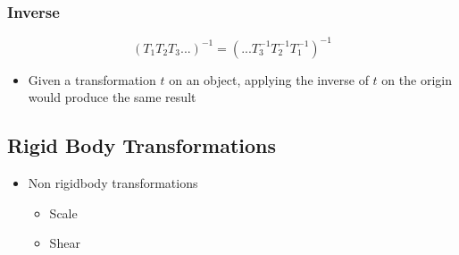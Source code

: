   \subsubsection{Inverse}

    \begin{equation}
      \left( T_{1} T_{2} T_{3} ... \right) ^{-1}
      = \left( ... T_{3}^{-1} T_{2}^{-1} T_{1}^{-1} \right) ^{-1}
    \end{equation}

    \begin{itemize}
      \item Given a transformation $ t $ on an object, applying the inverse of
      $ t $ on the origin would produce the same result
    \end{itemize}

\subsection{Rigid Body Transformations}

  \begin{itemize}
    \item Non rigidbody transformations
    \begin{itemize}
      \item Scale
      \item Shear
    \end{itemize}
  \end{itemize}
